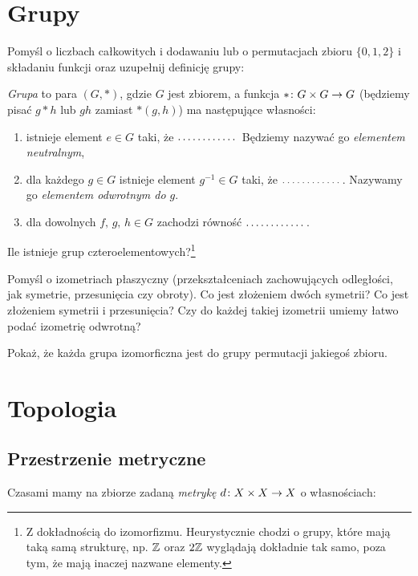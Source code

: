 \section{Grupy}

\begin{problem}
  Pomyśl o liczbach całkowitych i dodawaniu lub o permutacjach zbioru $\{0,1,2\}$ i składaniu funkcji oraz uzupełnij definicję grupy:

  \emph{Grupa} to para $(G, *)$, gdzie $G$ jest zbiorem, a funkcja $*\colon G\times G\to G$ (będziemy pisać $g*h$ lub $gh$ zamiast $*(g,h)$) ma następujące własności:
  \begin{enumerate}
    \item istnieje element $e\in G$ taki, że $\dots\dots\dots\dots$ Będziemy nazywać go \emph{elementem neutralnym},
    \item dla każdego $g\in G$ istnieje element $g^{-1}\in G$ taki, że $\dots\dots\dots\dots$. Nazywamy go
      \emph{elementem odwrotnym do $g$}.
      \item dla dowolnych $f,\, g,\, h\in G$ zachodzi równość $\dots\dots\dots\dots$.
    \end{enumerate}
\end{problem}

\vspace{-1cm}

\begin{problem}
  Ile istnieje grup czteroelementowych?\footnote{Z dokładnością do izomorfizmu. Heurystycznie chodzi o grupy, które mają taką samą strukturę, np. $\mathbb{Z}$ oraz $2\mathbb{Z}$ wyglądają dokładnie tak samo, poza tym, że mają inaczej nazwane elementy.}
\end{problem}

\begin{problem}
  Pomyśl o izometriach płaszyczny (przekształceniach zachowujących odległości, jak symetrie, przesunięcia czy obroty). Co jest złożeniem dwóch symetrii? Co jest złożeniem
symetrii i przesunięcia? Czy do każdej takiej izometrii umiemy łatwo podać izometrię odwrotną?
\end{problem}

\begin{problem}
    Pokaż, że każda grupa izomorficzna jest do grupy permutacji jakiegoś zbioru.
\end{problem}

\section{Topologia}
\subsection{Przestrzenie metryczne}
Czasami mamy na zbiorze zadaną \emph{metrykę} $d\colon X\times X\to X$ o własnościach:


